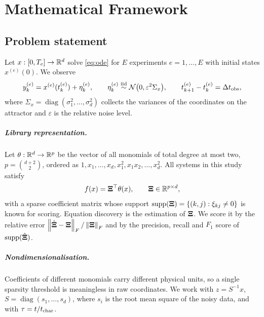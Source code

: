 \chapter{Mathematical Framework}\label{ch:framework}

\section{Problem statement}

Let $x:[0,T_e]\to\mathbb{R}^d$ solve \eqref{eq:ode} for $E$ experiments $e=1,\dots,E$ with initial states $x^{(e)}(0)$. We observe
\begin{equation}\label{eq:obs}
  y^{(e)}_k = x^{(e)}(t^{(e)}_k) + \eta^{(e)}_k,\qquad \eta^{(e)}_k \overset{\text{iid}}{\sim}\mathcal N\big(0,\varepsilon^2\Sigma_x\big),\qquad t^{(e)}_{k+1}-t^{(e)}_k=\Delta t_{\mathrm{obs}},
\end{equation}
where $\Sigma_x=\operatorname{diag}(\sigma_1^2,\dots,\sigma_d^2)$ collects the variances of the coordinates on the attractor and $\varepsilon$ is the relative noise level.

\paragraph{Library representation.} Let $\theta:\mathbb{R}^d\to\mathbb{R}^p$ be the vector of all monomials of total degree at most two, $p=\binom{d+2}{2}$, ordered as $1, x_1,\dots,x_d, x_1^2, x_1x_2,\dots,x_d^2$. All systems in this study satisfy
\begin{equation}\label{eq:library}
  f(x) = \bm{\Xi}^\top\theta(x),\qquad \bm{\Xi}\in\mathbb{R}^{p\times d},
\end{equation}
with a sparse coefficient matrix whose support $\operatorname{supp}(\bm{\Xi})=\{(k,j):\xi_{kj}\neq 0\}$ is known for scoring. Equation discovery is the estimation of $\bm{\Xi}$. We score it by the relative error $\left\lVert \hat{\bm{\Xi}}-\bm{\Xi}\right\rVert_F/\left\lVert \bm{\Xi}\right\rVert_F$ and by the precision, recall and $F_1$ score of $\operatorname{supp}(\hat{\bm{\Xi}})$.

\paragraph{Nondimensionalisation.} Coefficients of different monomials carry different physical units, so a single sparsity threshold is meaningless in raw coordinates. We work with $z=S^{-1}x$, $S=\operatorname{diag}(s_1,\dots,s_d)$, where $s_i$ is the root mean square of the noisy data, and with $\tau=t/t_{\mathrm{char}}$.


